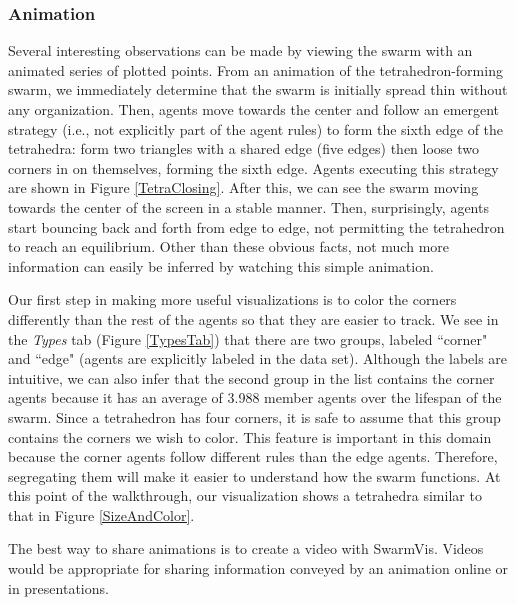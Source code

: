 \documentclass[conference]{IEEEtran}
\begin{document}
\subsubsection{Animation}

Several interesting observations can be made by viewing the swarm with an animated series of plotted points.
From an animation of the tetrahedron-forming swarm,
we immediately determine that the swarm is initially spread thin without any organization.
Then, agents move towards the center and follow an emergent strategy (i.e., not explicitly part of the agent rules)
to form the sixth edge of the tetrahedra: form two triangles with a shared edge (five edges) then loose two corners
in on themselves, forming the sixth edge. Agents executing this strategy are shown in Figure \ref{TetraClosing}.
After this, we can see the swarm moving towards the center of the screen in a stable manner.
Then, surprisingly, agents start bouncing back and forth from edge to edge, not permitting the tetrahedron to
reach an equilibrium. Other than these obvious facts, not much more information can easily be inferred by watching this simple animation.

Our first step in making more useful visualizations is to color the corners differently than the rest of the agents so that
they are easier to track. We see in the \textit{Types} tab (Figure \ref{TypesTab}) that there are two groups, labeled
``corner" and ``edge" (agents are explicitly labeled in the data set). Although the labels are intuitive, we can also infer that the second group in the list contains the corner agents because it has an average of 3.988 member agents over the lifespan of the swarm.
Since a tetrahedron has four corners, it is safe to assume that this group contains the corners we wish to color.
This feature is important in this domain because the corner agents follow different rules than the edge agents.
Therefore, segregating them will make it easier to understand how the swarm functions.
At this point of the walkthrough, our visualization shows a tetrahedra similar to that in Figure \ref{SizeAndColor}.

The best way to share animations is to create a video with SwarmVis.
Videos would be appropriate for sharing information conveyed by an animation online or in presentations.
\end{document}
